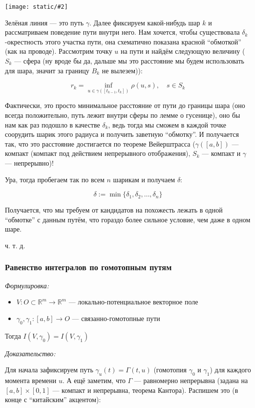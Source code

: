 \documentclass{article}
\def\images#1#2{\begin{center}\texttt{[image: static/\#2]}\end{center}}
\begin{document}
\images{0.35}{lemm_blz_dann.jpg}

Зелёная линия --- это путь $\gamma$. Далее фиксируем какой-нибудь шар $k$ и рассматриваем поведение пути внутри него. Нам хочется, чтобы существовала $\delta_k$-окрестность этого участка пути, она схематично показана красной ``обмоткой'' (как на проводе). Рассмотрим точку $u$ на пути и найдём следующую величину ($S_k$ --- сфера (ну вроде бы да, дальше мы это расстояние мы будем использовать для шара, значит за границу $B_k$ не вылезем)):

\[r_k = \inf_{u \in \gamma([t_{k - 1}, t_k])} \rho(u, s), \quad s \in S_k\]

Фактически, это просто минимальное расстояние от пути до границы шара (оно всегда положительно, путь лежит внутри сферы по лемме о гусенице), оно бы нам как раз подошло в качестве $\delta_k$, ведь тогда мы сможем в каждой точке соорудить шарик этого радиуса и получить заветную ``обмотку''. И получается так, что это расстояние достигается по теореме Вейерштрасса ($\gamma([a, b])$ --- компакт (компакт под действием непрерывного отображения), $S_k$ --- компакт и $\gamma$ --- непрерывно)!

Ура, тогда пробегаем так по всем $n$ шарикам и получаем $\delta$:

\[\delta := \min \{ \delta_1, \delta_2, \ldots, \delta_n \} \]

Получается, что мы требуем от кандидатов на похожесть лежать в одной ``обмотке'' с данным путём, что гораздо более сильное условие, чем даже в одном шаре.

ч. т. д. 

\subsubsection{Равенство интегралов по гомотопным путям}
\textit{Формулировка:}

\begin{itemize}
    \item $V: O \subset \mathbb{R}^m \rightarrow \mathbb{R}^m$ --- локально-потенциальное векторное поле
    \item $\gamma_0, \gamma_1: [a, b] \rightarrow O$ --- связанно-гомотопные пути
\end{itemize}

Тогда $I(V, \gamma_0) = I(V, \gamma_1)$

\textit{Доказательство:}

Для начала зафиксируем путь $\gamma_u(t) = \Gamma(t, u)$ (гомотопия $\gamma_0$ и $\gamma_1$) для каждого момента времени $u$. А ещё заметим, что $\Gamma$ --- равномерно непрерывна (задана на $[a, b] \times [0, 1]$ --- компакт и непрерывна, теорема Кантора). Распишем это (в конце с ``китайским'' акцентом):
\end{document}

